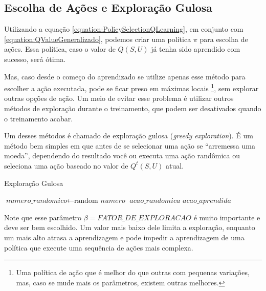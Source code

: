 \subsection{Escolha de Ações e Exploração Gulosa} \label{subsection:EscolhaDeAçõesExploraçãoGulosa}

Utilizando a equação \ref{equation:PolicySelectionQLearning}, em conjunto com \ref{equation:QValueGeneralizado}, podemos criar uma política $ \pi $ para escolha de ações. Essa política, caso o valor de $ Q \left( S, U \right) $ já tenha sido aprendido com sucesso, será ótima.

Mas, caso desde o começo do aprendizado se utilize apenas esse método para escolher a ação executada, pode se ficar preso em máximas locais%
\footnote{Uma política de ação que é melhor do que outras com pequenas variações, mas, caso se mude mais os parâmetros, existem outras melhores.%
}, sem explorar outras opções de ação. Um meio de evitar esse problema é utilizar outros métodos de exploração durante o treinamento, que podem ser desativados quando o treinamento acabar. 

Um desses métodos é chamado de exploração gulosa (\textit{greedy exploration}). É um método bem simples em que antes de se selecionar uma ação se ``arremessa uma moeda'', dependendo do resultado você ou executa uma ação randômica ou seleciona uma ação baseado no valor de $ Q^t \left( S, U \right) $ atual.

\begin{algorithm}[H]
	\caption{Exploração Gulosa} \label{euclid}
	\begin{algorithmic}[1]
			\State $\textit{numero\_randomico} \gets \text{random }\textit{numero}$
				\State \Return $\textit{acao\_randomica}$
			\Else
				\State \Return $\textit{acao\_aprendida}$
			\EndIf
		\EndProcedure
	\end{algorithmic}
\end{algorithm}

Note que esse parâmetro $ \beta = \textit{FATOR\_DE\_EXPLORACAO} $ é muito importante e deve ser bem escolhido. Um valor mais baixo dele limita a exploração, enquanto um mais alto atrasa a aprendizagem e pode impedir a aprendizagem de uma política que execute uma sequência de ações mais complexa.
